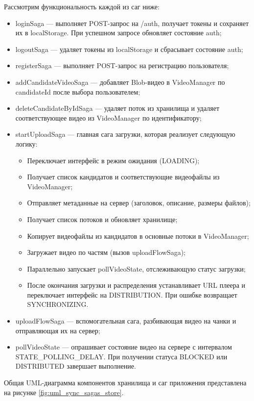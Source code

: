 	Рассмотрим функциональность каждой из саг ниже:
	\begin{itemize}[label=$\bullet$]
		\item loginSaga — выполняет POST-запрос на /auth, получает токены и сохраняет их в localStorage. При успешном запросе обновляет состояние auth;
		\item logoutSaga — удаляет токены из localStorage и сбрасывает состояние auth;
		\item registerSaga — выполняет POST-запрос на регистрацию пользователя;
		\item addCandidateVideoSaga — добавляет Blob-видео в VideoManager по candidateId после выбора пользователем;
		\item deleteCandidateByIdSaga — удаляет поток из хранилища и удаляет соответствующее видео из VideoManager по идентификатору;
		\item startUploadSaga — главная сага загрузки, которая реализует следующую логику:
		\begin{itemize}[label=$\circ$]
			\item Переключает интерфейс в режим ожидания (LOADING);
			\item Получает список кандидатов и соответствующие видеофайлы из VideoManager;
			\item Отправляет метаданные на сервер (заголовок, описание, размеры файлов);
			\item Получает список потоков и обновляет хранилище;
			\item Копирует видеофайлы из кандидатов в основные потоки в VideoManager;
			\item Загружает видео по частям (вызов uploadFlowSaga);
			\item Параллельно запускает pollVideoState, отслеживающую статус загрузки;
			\item После окончания загрузки и распределения устанавливает URL плеера и переключает интерфейс на DISTRIBUTION. При ошибке возвращает SYNCHRONIZING.
		\end{itemize}
		\item uploadFlowSaga — вспомогательная сага, разбивающая видео на чанки и отправляющая их на сервер;
		\item pollVideoState — опрашивает состояние видео на сервере с интервалом STATE\_POLLING\_DELAY. При получении статуса BLOCKED или DISTRIBUTED завершает выполнение.
	\end{itemize}
	
	Общая UML-диаграмма компонентов хранилища и саг приложения представлена на рисунке \ref{fig:uml_sync_sagas_store}.
	
